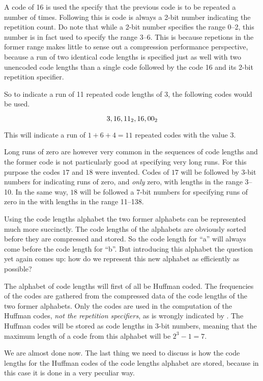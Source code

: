 A code of 16 is used the specify that the previous code is to be
repeated a number of times. Following this is code is always a 2-bit
number indicating the repetition count. Do note that while a 2-bit
number specifies the range 0--2, this number is in fact used to specify
the range 3--6. This is because repetions in the former range makes
little to sense out a compression performance perspective, because a
run of two identical code lengths is specified just as well with two
unencoded code lengths than a single code followed by the code 16 and
its 2-bit repetition specifier.

So to indicate a run of 11 repeated code lengths of $3$, the following
codes would be used.

\begin{equation*}
  3, 16, \mbox{\ensuremath{11_2}}, 16, \mbox{\ensuremath{00_2}}
\end{equation*}

This will indicate a run of $1 + 6 + 4 = 11$ repeated codes with the
value $3$.

Long runs of zero are however very common in the sequences of code
lengths and the former code is not particularly good at specifying
very long runs. For this purpose the codes $17$ and $18$ were
invented. Codes of $17$ will be followed by 3-bit numbers for
indicating runs of zero, and \textit{only} zero, with lengths in the
range 3--10. In the same way, $18$ will be followed a 7-bit numbers
for specifying runs of zero in the with lengths in the range 11--138.

Using the code lengths alphabet the two former alphabets can be
represented much more succinctly. The code lengths of the alphabets
are obviously sorted before they are compressed and stored. So the
code length for ``a'' will always come before the code length for
``b''. But introducing this alphabet the question yet again comes up:
how do we represent this new alphabet as efficiently as possible?

The alphabet of code lengths will first of all be Huffman coded. The
frequencies of the codes are gathered from the compressed data of the
code lengths of the two former alphabets. Only the codes are used in
the computation of the Huffman codes, \textit{not the repetition
  specifiers}, as is wrongly indicated by \cite{Salomon:2004:DCC}. The
Huffman codes will be stored as code lengths in 3-bit numbers, meaning
that the maximum length of a code from this alphabet will be $2^3 - 1
= 7$.

We are almost done now. The last thing we need to discuss is how the
code lengths for the Huffman codes of the code lengths alphabet are
stored, because in this case it is done in a very peculiar way.

